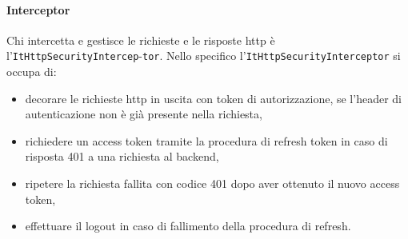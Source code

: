 \paragraph{Interceptor} Chi intercetta e gestisce le richieste e le risposte http è l'\verb|ItHttpSecurityIntercep|-\verb|tor|.
Nello specifico l'\verb|ItHttpSecurityInterceptor| si occupa di: 
\begin{itemize}
    \item decorare le richieste http in uscita con token di autorizzazione, se l'header di autenticazione non è già presente nella richiesta,
    \item richiedere un access token tramite la procedura di refresh token in caso di risposta 401 a una richiesta al backend,
    \item ripetere la richiesta fallita con codice 401 dopo aver ottenuto il nuovo access token, 
    \item effettuare il logout in caso di fallimento della procedura di refresh.
\end{itemize}